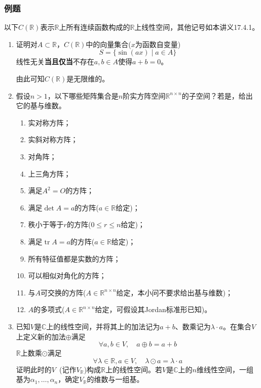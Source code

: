 \documentclass[a4paper,UTF8,fontset=windows,AutoFakeBold]{ctexart}
\DeclareMathOperator{\tr}{tr}
\newcommand*{\note}{\noindent *}
\begin{document}
\subsubsection{例题}
以下$C(\mathbb{R})$表示$\mathbb{R}$上所有连续函数构成的$\mathbb{R}$上线性空间，其他记号如本讲义17.4.1。
\begin{enumerate}
    \item 证明对$A\subset\mathbb{R}$，$C(\mathbb{R})$中的向量集合($x$为函数自变量)
    $$S=\{\sin(ax)\mid a\in A\}$$
    线性无关\textbf{当且仅当}不存在$a,b\in A$使得$a+b=0$。

    \note 由此可知$C(\mathbb{R})$是无限维的。

    \item 假设$n>1$，以下哪些矩阵集合是$n$阶实方阵空间$\mathbb{R}^{n\times n}$的子空间？若是，给出它的基与维数。
    \begin{enumerate}
        \item 实对称方阵；
        \item 实斜对称方阵；
        \item 对角阵；
        \item 上三角方阵；
        \item 满足$A^2=O$的方阵；
        \item 满足$\det A=a$的方阵($a\in\mathbb{R}$给定)；
        \item 秩小于等于$r$的方阵($0\le r\le n$给定)；
        \item 满足$\tr A=a$的方阵($a\in\mathbb{R}$给定)；
        \item 所有特征值都是实数的方阵；
        \item 可以相似对角化的方阵；
        \item 与$A$可交换的方阵($A\in\mathbb{R}^{n\times n}$给定，本小问不要求给出基与维数)；
        \item $A$的多项式($A\in\mathbb{R}^{n\times n}$给定，可假设其Jordan标准形已知)。
    \end{enumerate}
    
    \item 已知$V$是$\mathbb{C}$上的线性空间，并将其上的加法记为$a+b$、数乘记为$\lambda\cdot a$。在集合$V$上定义新的加法$\oplus$满足
    $$\forall a,b\in V,\quad a\oplus b=a+b$$
    $\mathbb{R}$上数乘$\odot$满足
    $$\forall \lambda\in\mathbb{R},a\in V,\quad\lambda\odot a=\lambda\cdot a$$
    证明此时的$V$\ (记作$V_\mathbb{R}$)构成$\mathbb{R}$上的线性空间。若$V$是$\mathbb{C}$上的$n$维线性空间，一组基为$\alpha_1,\dots,\alpha_n$，确定$V_\mathbb{R}$的维数与一组基。
    

\end{enumerate}
\end{document}

